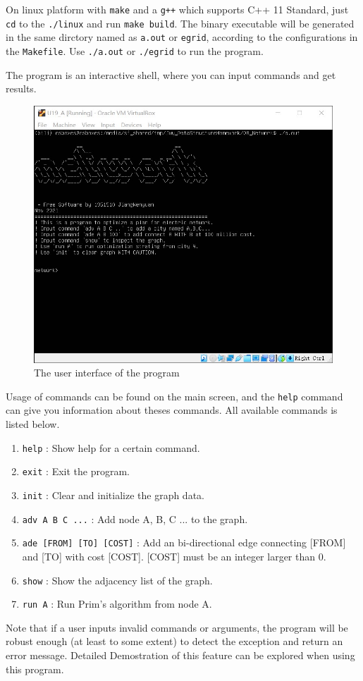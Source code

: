 \documentclass[cn,black,12pt,normal]{elegantnote}
\begin{document}
On linux platform with \lstinline{make} and a \lstinline{g++} which supports C++ 11 Standard, just \lstinline{cd} to the \lstinline{./linux} and run \lstinline{make build}. The binary executable will be generated in the same dirctory named as \lstinline{a.out} or \lstinline{egrid}, according to the configurations in the \lstinline{Makefile}. Use \lstinline{./a.out} or \lstinline{./egrid} to run the program.

The program is an interactive shell, where you can input commands and get results.

\begin{figure}[H]
    \centering
    \includegraphics[width=0.7\linewidth]{image/grid_01.jpg}
    \caption{The user interface of the program}
\end{figure}

Usage of commands can be found on the main screen, and the \lstinline{help} command can give you information about theses commands.  All available commands is listed below.

\begin{enumerate}
    \item \lstinline{help} : Show help for a certain command.
    \item \lstinline{exit} : Exit the program.
    \item \lstinline{init} : Clear and initialize the graph data.
    \item \lstinline{adv A B C ...} : Add node A, B, C ... to the graph.
    \item \lstinline{ade [FROM] [TO] [COST]} : Add an bi-directional edge connecting [FROM] and [TO] with cost [COST]. [COST] must be an integer larger than 0.
    \item \lstinline{show} : Show the adjacency list of the graph.
    \item \lstinline{run A} : Run Prim's algorithm from node A.
\end{enumerate}
Note that if a user inputs invalid commands or arguments, the program will be robust enough (at least to some extent) to detect the exception and return an error message. Detailed Demostration of this feature can be explored when using this program.
\end{document}
